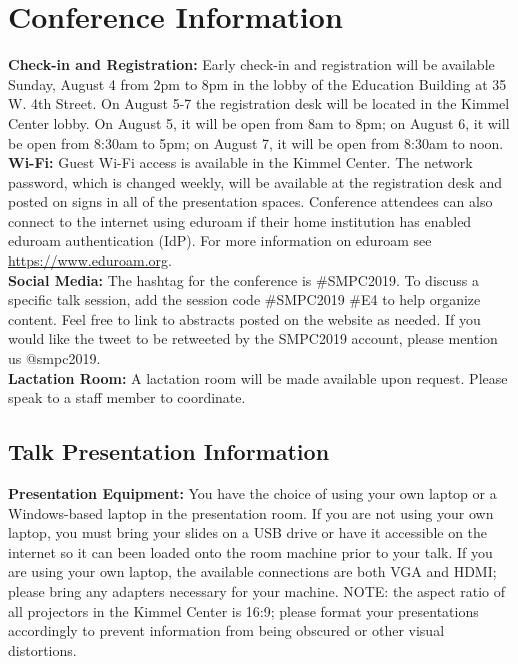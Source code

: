 \section*{Conference Information}


\noindent \textbf{Check-in and Registration:}  Early check-in and registration will be available Sunday, August 4 from 2pm to 8pm in the lobby of the Education Building at 35 W. 4th Street. On August 5-7 the registration desk will be located in the Kimmel Center lobby. On August 5, it will be open from 8am to 8pm; on August 6, it will be open from 8:30am to 5pm; on August 7, it will be open from 8:30am to noon.\\

\noindent \textbf{Wi-Fi:} Guest Wi-Fi access is available in the Kimmel Center.  The network password, which is changed weekly, will be available at the registration desk and posted on signs in all of the presentation spaces.  Conference attendees can also connect to the internet using eduroam if their home institution has enabled eduroam authentication (IdP). For more information on eduroam see \href{https://www.eduroam.org}{https://www.eduroam.org}.\\

\noindent \textbf{Social Media:} The hashtag for the conference is \#SMPC2019. To discuss a specific talk session, add the session code \#SMPC2019 \#E4 to help organize content. Feel free to link to abstracts posted on the website as needed. If you would like the tweet to be retweeted by the SMPC2019 account, please mention us @smpc2019.\\

\noindent \textbf{Lactation Room:} A lactation room will be made available upon request. Please speak to a staff member to coordinate. 

\subsection*{Talk Presentation Information}
\noindent \textbf{Presentation Equipment:} You have the choice of using your own laptop or a Windows-based laptop in the presentation room. If you are not using your own laptop, you must bring your slides on a USB drive or have it accessible on the internet so it can been loaded onto the room machine prior to your talk. If you are using your own laptop, the available connections are both VGA and HDMI; please bring any adapters necessary for your machine. NOTE: the aspect ratio of all projectors in the Kimmel Center is 16:9; please format your presentations accordingly to prevent information from being obscured or other visual distortions.\\

